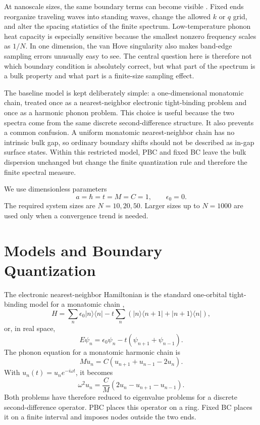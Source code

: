 ﻿\documentclass[a4paper,aps,prb,reprint,floatfix,nofootinbib,longbibliography]{revtex4-2}
\begin{document}
At nanoscale sizes, the same boundary terms can become visible \cite{Datta,Cardy}.  Fixed ends reorganize traveling waves into standing waves, change the allowed \(k\) or \(q\) grid, and alter the spacing statistics of the finite spectrum.  Low-temperature phonon heat capacity is especially sensitive because the smallest nonzero frequency scales as \(1/N\).  In one dimension, the van Hove singularity also makes band-edge sampling errors unusually easy to see.  The central question here is therefore not which boundary condition is absolutely correct, but what part of the spectrum is a bulk property and what part is a finite-size sampling effect.

The baseline model is kept deliberately simple: a one-dimensional monatomic chain, treated once as a nearest-neighbor electronic tight-binding problem and once as a harmonic phonon problem.  This choice is useful because the two spectra come from the same discrete second-difference structure.  It also prevents a common confusion.  A uniform monatomic nearest-neighbor chain has no intrinsic bulk gap, so ordinary boundary shifts should not be described as in-gap surface states.  Within this restricted model, PBC and fixed BC leave the bulk dispersion unchanged but change the finite quantization rule and therefore the finite spectral measure.

We use dimensionless parameters
\[
a=\hbar=t=M=C=1,\qquad \epsilon_0=0 .
\]
The required system sizes are \(N=10,20,50\).  Larger sizes up to \(N=1000\) are used only when a convergence trend is needed.

\section{Models and Boundary Quantization}

The electronic nearest-neighbor Hamiltonian is the standard one-orbital tight-binding model for a monatomic chain \cite{AshcroftMermin,Kittel},
\begin{equation}
H=\sum_n \epsilon_0 |n\rangle\langle n|
-t\sum_n\left(|n\rangle\langle n+1|+|n+1\rangle\langle n|\right),
\end{equation}
or, in real space,
\begin{equation}
E\psi_n=\epsilon_0\psi_n-t(\psi_{n+1}+\psi_{n-1}).
\end{equation}
The phonon equation for a monatomic harmonic chain is \cite{Kittel}
\begin{equation}
M\ddot u_n=C(u_{n+1}+u_{n-1}-2u_n).
\end{equation}
With \(u_n(t)=u_n e^{-i\omega t}\), it becomes
\begin{equation}
\omega^2 u_n=\frac{C}{M}(2u_n-u_{n+1}-u_{n-1}).
\end{equation}
Both problems have therefore reduced to eigenvalue problems for a discrete second-difference operator.  PBC places this operator on a ring.  Fixed BC places it on a finite interval and imposes nodes outside the two ends.
\end{document}
